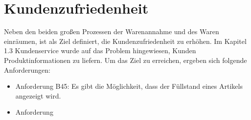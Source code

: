 \section{Kundenzufriedenheit} 
Neben den beiden großen Prozessen der Warenannahme und des Waren einräumen, ist als Ziel definiert, die Kundenzufriedenheit zu erhöhen. Im Kapitel 1.3 Kundenservice wurde auf das Problem hingewiesen, Kunden Produktinformationen zu liefern. Um das Ziel zu erreichen, ergeben sich folgende Anforderungen: 
\begin{itemize}
	\item Anforderung B45: Es gibt die Möglichkeit, dass der Füllstand eines Artikels angezeigt wird. \label{anforderung_b45}
	\item Anforderung 
	
\end{itemize}
